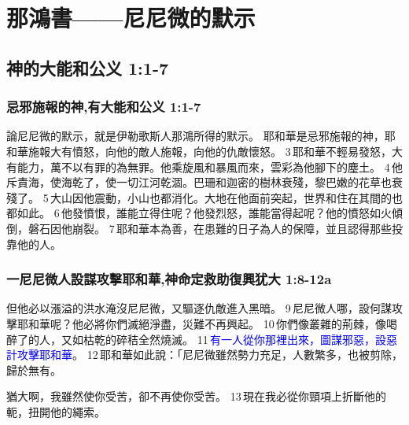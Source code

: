 \vspace{-5mm}
\chapter{那鴻書——尼尼微的默示}

\vspace{-3mm}

\section{神的大能和公义 1:1-7}


\subsection{忌邪施報的神,有大能和公义 1:1-7}
論尼尼微的默示，就是伊勒歌斯人那鴻所得的默示。
耶和華是忌邪施報的神，耶和華施報大有憤怒，向他的敵人施報，向他的仇敵懷怒。 3 耶和華不輕易發怒，大有能力，萬不以有罪的為無罪。他乘旋風和暴風而來，雲彩為他腳下的塵土。 4 他斥責海，使海乾了，使一切江河乾涸。巴珊和迦密的樹林衰殘，黎巴嫩的花草也衰殘了。 5 大山因他震動，小山也都消化。大地在他面前突起，世界和住在其間的也都如此。 6 他發憤恨，誰能立得住呢？他發烈怒，誰能當得起呢？他的憤怒如火傾倒，磐石因他崩裂。
7 耶和華本為善，在患難的日子為人的保障，並且認得那些投靠他的人。

\subsection{一尼尼微人設謀攻擊耶和華,神命定救助復興犹大 1:8-12a}
但他必以漲溢的洪水淹沒尼尼微，又驅逐仇敵進入黑暗。
9 尼尼微人哪，設何謀攻擊耶和華呢？他必將你們滅絕淨盡，災難不再興起。 10 你們像叢雜的荊棘，像喝醉了的人，又如枯乾的碎秸全然燒滅。 11 \textcolor{blue}{有一人從你那裡出來，圖謀邪惡，設惡計攻擊耶和華}。 12 耶和華如此說：「尼尼微雖然勢力充足，人數繁多，也被剪除，歸於無有。

猶大啊，我雖然使你受苦，卻不再使你受苦。 13 現在我必從你頸項上折斷他的軛，扭開他的繩索。

